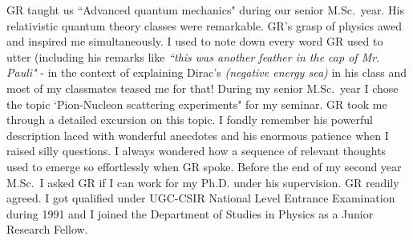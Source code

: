GR taught us ``Advanced quantum mechanics" during our senior M.Sc.\ year. His relativistic quantum theory classes were remarkable. GR's grasp of physics awed and inspired me simultaneously. I used to note down every word GR used to utter (including his remarks like \textit{``this was another feather in the cap of Mr. Pauli"} - in the context of explaining Dirac's \textit{(negative energy sea)} in his class and most of my classmates teased me for that! During my senior M.Sc.\ year I chose the topic `Pion-Nucleon scattering experiments" for my seminar. GR took me through a detailed excursion on this topic. I fondly remember his powerful description laced with wonderful anecdotes and his enormous patience when I raised silly questions. I always wondered how a sequence of relevant thoughts used to emerge so effortlessly when GR spoke. Before the end of my second year M.Sc.\ I asked GR if I can work for my Ph.D. under his supervision. GR readily agreed. I got qualified under UGC-CSIR National Level Entrance Examination during 1991 and I joined the Department of Studies in Physics as a Junior Research Fellow.


